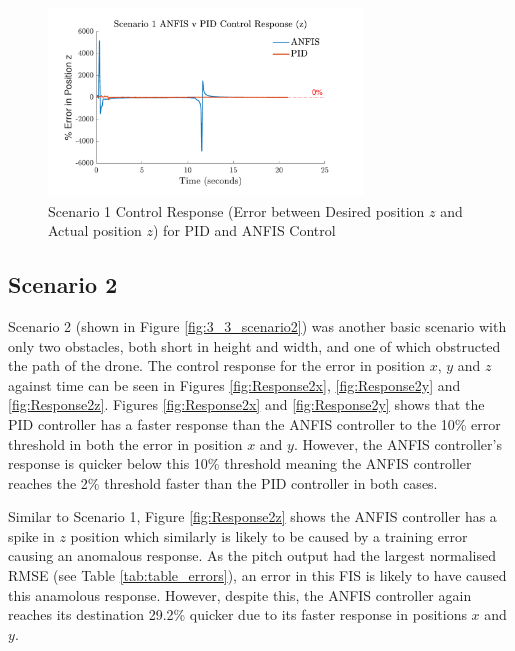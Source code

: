 \begin{figure}[H]
    \centering
    \begin{minipage}[b]{0.45\textwidth}
    \end{minipage}
    \hfill
    \begin{minipage}[b]{0.45\textwidth}
        \centering
        \includegraphics[height=5cm,keepaspectratio]{img/Scenario 1 Error in z Position.pdf}
        \caption{Scenario 1 Control Response (Error between Desired position $z$ and Actual position $z$) for PID and ANFIS Control}
        \label{fig:Response1z}
    \end{minipage}
    \hfill
    \begin{minipage}[b]{0.45\textwidth}
    \end{minipage}
\end{figure}

\subsection{Scenario 2}

Scenario 2 (shown in Figure \ref{fig:3_3_scenario2}) was another basic scenario with only two obstacles, both short in height and width, and one of which obstructed the path of the drone. The control response for the error in position $x$, $y$ and $z$ against time can be seen in Figures \ref{fig:Response2x}, \ref{fig:Response2y} and \ref{fig:Response2z}. Figures \ref{fig:Response2x} and \ref{fig:Response2y} shows that the PID controller has a faster response than the ANFIS controller to the 10\% error threshold in both the error in position $x$ and $y$. However, the ANFIS controller's response is quicker below this 10\% threshold meaning the ANFIS controller reaches the 2\% threshold faster than the PID controller in both cases. 

Similar to Scenario 1, Figure \ref{fig:Response2z} shows the ANFIS controller has a spike in $z$ position which similarly is likely to be caused by a training error causing an anomalous response. As the pitch output had the largest normalised RMSE (see Table \ref{tab:table_errors}), an error in this FIS is likely to have caused this anamolous response. However, despite this, the ANFIS controller again reaches its destination 29.2\% quicker due to its faster response in positions $x$ and $y$. 

